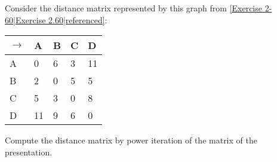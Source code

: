 
Consider the distance matrix represented by this graph from \ref{Exercise 2-60|Exercise 2.60|referenced}:


    \begin{minipage}{0.48\textwidth}
      \centering
      \begin{tabular}{|l|l|l|l|l|}
        \hline

        $\rightarrow$ & A  & B & C & D  \\ \hline
        A             & 0  & 6 & 3 & 11 \\ \hline
        B             & 2  & 0 & 5 & 5  \\ \hline
        C             & 5  & 3 & 0 & 8  \\ \hline
        D             & 11 & 9 & 6 & 0  \\ \hline
      \end{tabular}
    \end{minipage}

    Compute the distance matrix by power iteration of the matrix of the presentation.